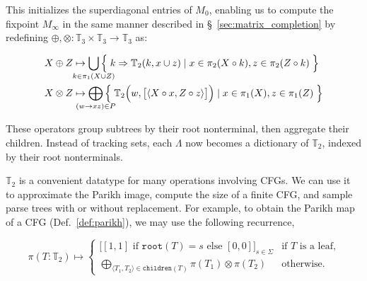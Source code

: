 \documentclass[sigplan,review,acmsmall,nonacm,anonymous]{acmart}\settopmatter{printfolios=false,printccs=false,printacmref=false}
\begin{document}
\noindent This initializes the superdiagonal entries of $M_0$, enabling us to compute the fixpoint $M_\infty$ in the same manner described in \S~\ref{sec:matrix_completion} by redefining $\oplus, \otimes: \mathbb{T}_3 \times \mathbb{T}_3 \rightarrow \mathbb{T}_3$ as:

\vspace{-5pt}\begin{align}
  X \oplus Z &\mapsto \bigcup_{\mathclap{k\in \pi_1(X \cup Z)}}\Big\{\phantom{.}k \Rightarrow \mathbb{T}_2(k, x \cup z) \mid x \in \pi_2(X\circ k), z \in \pi_2(Z\circ k)\phantom{.}\Big\}\\
  X \otimes Z &\mapsto \bigoplus_{\mathclap{(w\rightarrow xz) \in P}}\Big\{\phantom{.}\mathbb{T}_2\Big(w, \big[\langle X\circ x, Z\circ z\rangle\big]\Big) \mid x \in \pi_1(X), z \in \pi_1(Z)\phantom{.}\Big\}
\end{align}

These operators group subtrees by their root nonterminal, then aggregate their children. Instead of tracking sets, each $\Lambda$ now becomes a dictionary of $\mathbb{T}_2$, indexed by their root nonterminals.

  $\mathbb{T}_2$ is a convenient datatype for many operations involving CFGs. We can use it to approximate the Parikh image, compute the size of a finite CFG, and sample parse trees with or without replacement. For example, to obtain the Parikh map of a CFG (Def.~\ref{def:parikh}), we may use the following recurrence,

\begin{equation}
  \pi(T: \mathbb{T}_2) \mapsto \begin{cases}
  \big[[1, 1] \text{ if } \texttt{root}(T) = s \text{ else } [0, 0]\big]_{s\in \Sigma}  & \text{if $T$ is a leaf,} \\
  \bigoplus_{\langle T_1, T_2\rangle \in \texttt{children}(T)} \pi(T_1) \otimes \pi(T_2) & \text{otherwise.}
  \end{cases}
\end{equation}

\end{document}
